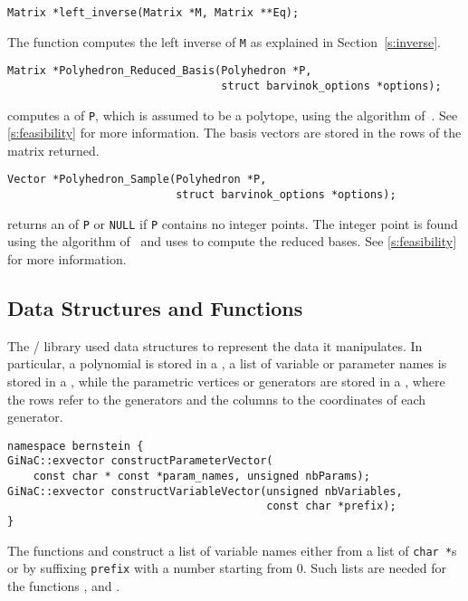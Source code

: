 \begin{verbatim}
Matrix *left_inverse(Matrix *M, Matrix **Eq);
\end{verbatim}
The  function computes the left inverse
of \verb+M+ as explained in Section~\ref{s:inverse}.

\begin{verbatim}
Matrix *Polyhedron_Reduced_Basis(Polyhedron *P,
                                 struct barvinok_options *options);
\end{verbatim}
 computes
a  of {\tt P}, which
is assumed to be a polytope, using the algorithm
of~.
See \autoref{s:feasibility} for more information.
The basis vectors are stored in the rows of the matrix returned.

\begin{verbatim}
Vector *Polyhedron_Sample(Polyhedron *P,
                          struct barvinok_options *options);
\end{verbatim}
 returns an  of {\tt P}
or {\tt NULL} if {\tt P} contains no integer points.
The integer point is found using the algorithm
of~ and uses
 to compute the reduced bases.
See \autoref{s:feasibility} for more information.

\subsection{\protect{} Data Structures and Functions}

The \bernstein/ library used  data structures to
represent the data it manipulates.
In particular, a polynomial is stored in a ,
a list of variable or parameter names is stored in a ,
while the parametric vertices or generators are stored in a ,
where the rows refer to the generators and the columns to the coordinates
of each generator.

\begin{verbatim}
namespace bernstein {
GiNaC::exvector constructParameterVector(
    const char * const *param_names, unsigned nbParams);
GiNaC::exvector constructVariableVector(unsigned nbVariables,
                                        const char *prefix);
}
\end{verbatim}
The functions 
and  construct a list of variable
names either from a list of {\tt char *}s or 
by suffixing {\tt prefix} with a number starting from 0.
Such lists are needed for the functions
, 
and .


